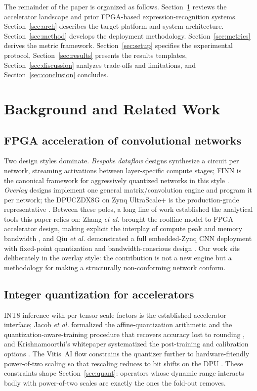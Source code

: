 \documentclass[onecolumn,journal]{IEEEtran}
\begin{document}
The remainder of the paper is organized as follows. Section~\ref{sec:related} reviews
the accelerator landscape and prior FPGA-based expression-recognition systems.
Section~\ref{sec:arch} describes the target platform and system architecture.
Section~\ref{sec:method} develops the deployment methodology.
Section~\ref{sec:metrics} derives the metric framework. Section~\ref{sec:setup}
specifies the experimental protocol, Section~\ref{sec:results} presents the results
templates, Section~\ref{sec:discussion} analyzes trade-offs and limitations, and
Section~\ref{sec:conclusion} concludes.

\section{Background and Related Work}\label{sec:related}

\subsection{FPGA acceleration of convolutional networks}
Two design styles dominate. \emph{Bespoke dataflow} designs synthesize a circuit per
network, streaming activations between layer-specific compute stages; FINN is the
canonical framework for aggressively quantized networks in this style
\cite{umuroglu2017finn}. \emph{Overlay} designs implement one general matrix/convolution
engine and program it per network; the DPUCZDX8G on Zynq UltraScale+ is the
production-grade representative \cite{amd_pg338}. Between these poles, a long line of
work established the analytical tools this paper relies on: Zhang \textit{et al.}
brought the roofline model to FPGA accelerator design, making explicit the interplay of
compute peak and memory bandwidth \cite{zhang2015optimizing}, and Qiu \textit{et al.}
demonstrated a full embedded-Zynq CNN deployment with fixed-point quantization and
bandwidth-conscious design \cite{qiu2016going}. Our work sits deliberately in the
overlay style: the contribution is not a new engine but a methodology for making a
structurally non-conforming network conform.

\subsection{Integer quantization for accelerators}
INT8 inference with per-tensor scale factors is the established accelerator interface;
Jacob \textit{et al.} formalized the affine-quantization arithmetic and the
quantization-aware-training procedure that recovers accuracy lost to rounding
\cite{jacob2018quantization}, and Krishnamoorthi's whitepaper systematized the
post-training and calibration options \cite{krishnamoorthi2018quantizing}. The Vitis~AI
flow constrains the quantizer further to hardware-friendly power-of-two scaling so that
rescaling reduces to bit shifts on the DPU \cite{amd_ug1414}. These constraints shape
Section~\ref{sec:quant}: operators whose dynamic range interacts badly with power-of-two
scales are exactly the ones the fold-out removes.
\end{document}
